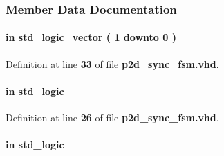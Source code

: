 \subsubsection{Member Data Documentation}
\paragraph[{ch\+\_\+en}]{ {\bfseries \textcolor{keywordflow}{in}\textcolor{vhdlchar}{ }} {\bfseries \textcolor{comment}{std\+\_\+logic\+\_\+vector}\textcolor{vhdlchar}{ }\textcolor{vhdlchar}{(}\textcolor{vhdlchar}{ }\textcolor{vhdlchar}{ } \textcolor{vhdldigit}{1} \textcolor{vhdlchar}{ }\textcolor{keywordflow}{downto}\textcolor{vhdlchar}{ }\textcolor{vhdlchar}{ } \textcolor{vhdldigit}{0} \textcolor{vhdlchar}{ }\textcolor{vhdlchar}{)}\textcolor{vhdlchar}{ }} \hspace{0.3cm}{\ttfamily [Port]}}\label{classp2d__sync__fsm_a6494f316f504075c4ccf47146756d576}


Definition at line {\bf 33} of file {\bf p2d\+\_\+sync\+\_\+fsm.\+vhd}.

\paragraph[{clk}]{ {\bfseries \textcolor{keywordflow}{in}\textcolor{vhdlchar}{ }} {\bfseries \textcolor{comment}{std\+\_\+logic}\textcolor{vhdlchar}{ }} \hspace{0.3cm}{\ttfamily [Port]}}\label{classp2d__sync__fsm_a4a4609c199d30b3adebbeb3a01276ec5}


Definition at line {\bf 26} of file {\bf p2d\+\_\+sync\+\_\+fsm.\+vhd}.

\paragraph[{ddr\+\_\+en}]{ {\bfseries \textcolor{keywordflow}{in}\textcolor{vhdlchar}{ }} {\bfseries \textcolor{comment}{std\+\_\+logic}\textcolor{vhdlchar}{ }} \hspace{0.3cm}{\ttfamily [Port]}}\label{classp2d__sync__fsm_adbfe05e6692f69f8e592df06c6055f0a}


